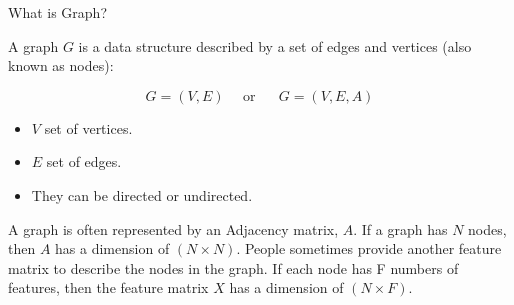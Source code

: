 \documentclass[aspectratio=169,xcolor=dvipsnames,svgnames,x11names,fleqn]{beamer}
\begin{document}
\begin{frame}{What is Graph?}

\footnotesize

\begin{center}
A graph $G$ is a data structure described by a set of edges and vertices (also known as nodes):

$$
G = (V, E) \text{~~~ or ~~~~} G = (V, E, A)
$$
\end{center}


\begin{itemize}
\item $V$ set of vertices.
\item $E$ set of edges.
\item They can be directed or undirected.
\end{itemize}

\begin{center}
A graph is often represented by an Adjacency matrix, $A$. If a graph has $N$ nodes, then $A$ has a dimension of $(N\times N)$. People sometimes provide another feature matrix to describe the nodes in the graph. If each node has F numbers of features, then the feature matrix $X$ has a dimension of $(N\times F)$.


\end{center}


\end{frame}
\end{document}
